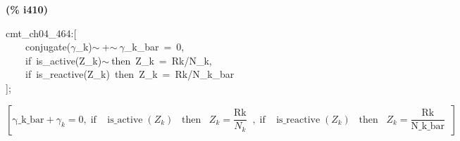 \documentclass[fleqn]{article}
\begin{document}
\noindent
\begin{minipage}[t]{4.000000em}\color{red}\bfseries
(\% i410)	
\end{minipage}
\begin{minipage}[t]{\textwidth}\color{blue}
cmt\_ch04\_464:[\\
\ \ \ \ conjugate(\ensuremath{\gamma}\_k)\ensuremath{\sim\ }+\ensuremath{\sim\ }\ensuremath{\gamma}\_k\_bar\ =\ 0,\\
\ \ \ \ if\ is\_active(Z\_k)\ensuremath{\sim\ }then\ Z\_k\ =\ Rk/N\_k,\\
\ \ \ \ if\ is\_reactive(Z\_k)\ then\ Z\_k\ =\ Rk/N\_k\_bar\\
];
\end{minipage}
\[\displaystyle \tag{\% o410} 
\left[ \ensuremath{\mathrm{\gamma \_ k\_ bar}}+{{\gamma }_k}=0\operatorname{,}\operatorname{if}\operatorname{ }\operatorname{is\_ active}\left( {Z_k}\right) \operatorname{ }\operatorname{then}\operatorname{ }{Z_k}=\frac{\ensuremath{\mathrm{Rk}}}{{N_k}}\operatorname{ }\operatorname{,}\operatorname{if}\operatorname{ }\operatorname{is\_ reactive}\left( {Z_k}\right) \operatorname{ }\operatorname{then}\operatorname{ }{Z_k}=\frac{\ensuremath{\mathrm{Rk}}}{\ensuremath{\mathrm{N\_ k\_ bar}}}\operatorname{ }\right] \mbox{}
\]
\end{document}
